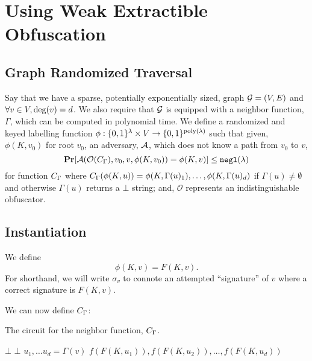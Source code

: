 \newcommand{\labelFunc}{\phi}
\newcommand{\imageFn}{\text{Image}}
\newcommand{\pathSuffix}{\text{Suff}}
\newcommand{\pathSet}{\mathcal{P}}
\newcommand{\obfFN}{\mathcal{O}}

\section{Using Weak Extractible Obfuscation}

\subsection{Graph Randomized Traversal}
Say that we have a sparse, potentially exponentially sized, graph $\mathcal{G} = (V, E)$
and $\forall v \in V, \deg(v) = d$.
We also require that $\mathcal{G}$ is equipped with a neighbor function, $\Gamma$, which can be computed in polynomial time.
We define a randomized and keyed labelling function $\phi: \{0,1\}^\lambda \times V \rightarrow \{0,1\}^{\operatorname{poly}(\lambda)}$ 
such that given, $\phi(K, v_0)$ for root $v_0$, an adversary, $\mathcal{A}$, which does not know a path from $v_0$ to $v$,
\begin{equation}
	\label{eq:guessPhi}
	\Pr[\advers(\mathcal{O}(\circNeigb), v_0, v, \labelFunc(K, v_0)) = \labelFunc(K, v)] \leq \negl(\lambda)
\end{equation}
for function $C_\Gamma$ where $\circNeigb(\labelFunc(K, u)) = \labelFunc(K, \Gamma(u)_1), \dots, \labelFunc(K, \Gamma(u)_d)$
if $\Gamma(u) \neq \emptyset$ and otherwise $\Gamma(u)$ returns a $\bot$ string;
and, $\mathcal{O}$ represents an indistinguishable obfuscator.

\subsection{Instantiation}
We define 
\begin{equation*}
	\labelFunc(K, v) = F(K, v).
\end{equation*}
For shorthand, we will write $\sigma_v$ to connote an attempted ``signature'' of $v$
where a correct signature is $F(K, v)$.

We can now define $C_\Gamma$:
\begin{algorithm}[H]
	\caption{
		The circuit for the neighbor function, $C_\Gamma$.
	}
	\begin{algorithmic}[1]
				\State \Return $\bot$
			\EndIf
				\State \Return $\bot$
			\EndIf
			\State $u_1, \dots u_d = \Gamma(v)$
			\State \Return $f(F(K, u_1)), f(F(K, u_2)), \dots, f(F(K, u_d))$
		\EndFunction
	\end{algorithmic}
	\label{alg:neighb}
\end{algorithm}


